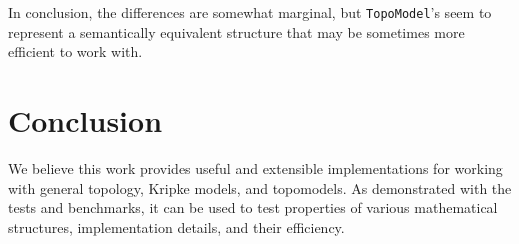 \documentclass[12pt, a4paper]{article}
\begin{document}
In conclusion, the differences are somewhat marginal, but \verb|TopoModel|'s seem to represent a semantically
equivalent structure that may be sometimes more efficient to work with.

\section{Conclusion}
We believe this work provides useful and extensible implementations for working with general topology, Kripke models, and topomodels. As demonstrated
with the tests and benchmarks, it can be used to test properties of various mathematical structures, implementation details,
and their efficiency.



\end{document}
